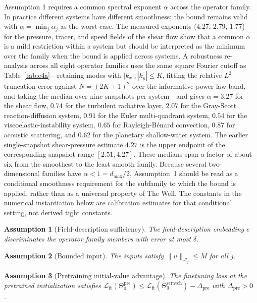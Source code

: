 \documentclass[preprint,12pt]{elsarticle}
\newtheorem{assumption}{Assumption}
\begin{document}
Assumption 1 requires a common spectral exponent $\alpha$ across the operator family. In practice different systems have different smoothness; the bound remains valid with $\alpha=\min_j\alpha_j$ as the worst case. The measured exponents ($4.27$, $2.79$, $1.77$) for the pressure, tracer, and speed fields of the shear flow show that a common $\alpha$ is a mild restriction within a system but should be interpreted as the minimum over the family when the bound is applied across systems. A robustness re-analysis across all eight operator families uses the same square Fourier cutoff as Table~\ref{tab:e4a}---retaining modes with $|k_x|,|k_y|\le K$, fitting the relative $L^2$ truncation error against $N=(2K+1)^2$ over the informative power-law band, and taking the median over nine snapshots per system---and gives $\alpha=3.27$ for the shear flow, $0.74$ for the turbulent radiative layer, $2.07$ for the Gray-Scott reaction-diffusion system, $0.91$ for the Euler multi-quadrant system, $0.54$ for the viscoelastic-instability system, $0.65$ for Rayleigh-B\'enard convection, $0.87$ for acoustic scattering, and $0.62$ for the planetary shallow-water system. The earlier single-snapshot shear-pressure estimate $4.27$ is the upper endpoint of the corresponding snapshot range $[2.51,4.27]$. These medians span a factor of about six from the smoothest to the least smooth family. Because several two-dimensional families have $\alpha<1=d_{\max}/2$, Assumption~1 should be read as a conditional smoothness requirement for the subfamily to which the bound is applied, rather than as a universal property of The Well. The constants in the numerical instantiation below are calibration estimates for that conditional setting, not derived tight constants.

\begin{assumption}[Field-description sufficiency]
The field-description embedding $e$ discriminates the operator family members with error at most $\delta$.
\end{assumption}
\begin{assumption}[Bounded input]
The inputs satisfy $\|u\|_{\mathcal{A}_j}\le M$ for all $j$.
\end{assumption}
\begin{assumption}[Pretraining initial-value advantage]
The finetuning loss at the pretrained initialization satisfies $\mathcal{L}_{\mathrm{ft}}(\Theta_0^{\mathrm{pre}})\le\mathcal{L}_{\mathrm{ft}}(\Theta_0^{\mathrm{scratch}})-\Delta_{\mathrm{pre}}$ with $\Delta_{\mathrm{pre}}>0$.
\end{assumption}
\end{document}
